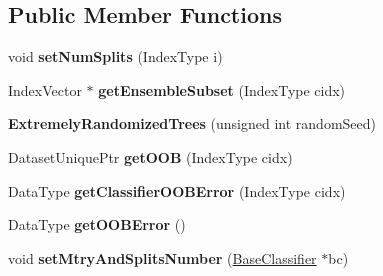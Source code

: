 \subsection*{Public Member Functions}
\begin{DoxyCompactItemize}
\item 
\hypertarget{classffactory_1_1_extremely_randomized_trees_aeb67beba0dc4e81389119a50678d62af}{void {\bfseries set\-Num\-Splits} (Index\-Type i)}\label{classffactory_1_1_extremely_randomized_trees_aeb67beba0dc4e81389119a50678d62af}

\item 
\hypertarget{classffactory_1_1_extremely_randomized_trees_af1ec2559f3dafb9d0ea6331b513eb83a}{Index\-Vector $\ast$ {\bfseries get\-Ensemble\-Subset} (Index\-Type cidx)}\label{classffactory_1_1_extremely_randomized_trees_af1ec2559f3dafb9d0ea6331b513eb83a}

\item 
\hypertarget{classffactory_1_1_extremely_randomized_trees_a661844653b70638cda0d00a6c54af495}{{\bfseries Extremely\-Randomized\-Trees} (unsigned int random\-Seed)}\label{classffactory_1_1_extremely_randomized_trees_a661844653b70638cda0d00a6c54af495}

\item 
\hypertarget{classffactory_1_1_extremely_randomized_trees_a9c38d3b661d6bf04aa932101bca8e2c1}{Dataset\-Unique\-Ptr {\bfseries get\-O\-O\-B} (Index\-Type cidx)}\label{classffactory_1_1_extremely_randomized_trees_a9c38d3b661d6bf04aa932101bca8e2c1}

\item 
\hypertarget{classffactory_1_1_extremely_randomized_trees_a752fd75e21b7a64df791a70a7f3816bc}{Data\-Type {\bfseries get\-Classifier\-O\-O\-B\-Error} (Index\-Type cidx)}\label{classffactory_1_1_extremely_randomized_trees_a752fd75e21b7a64df791a70a7f3816bc}

\item 
\hypertarget{classffactory_1_1_extremely_randomized_trees_a4e5d8ebbe450602f0cc34f298c56577c}{Data\-Type {\bfseries get\-O\-O\-B\-Error} ()}\label{classffactory_1_1_extremely_randomized_trees_a4e5d8ebbe450602f0cc34f298c56577c}

\item 
\hypertarget{classffactory_1_1_extremely_randomized_trees_afcdbfab6f57719bfdc4b7e6c8010c37c}{void {\bfseries set\-Mtry\-And\-Splits\-Number} (\hyperlink{classffactory_1_1_base_classifier}{Base\-Classifier} $\ast$bc)}\label{classffactory_1_1_extremely_randomized_trees_afcdbfab6f57719bfdc4b7e6c8010c37c}


\end{DoxyCompactItemize}
